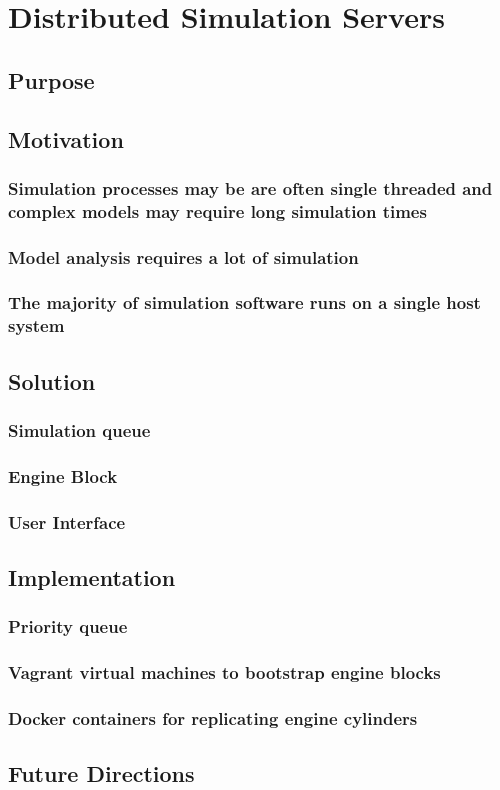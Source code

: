 \chapter{Distributed Simulation Servers}
\label{chap:engine}

\section{Purpose}


\section{Motivation}
\subsection{Simulation processes may be are often single threaded and complex models may require long simulation times}
\subsection{Model analysis requires a lot of simulation}
\subsection{The majority of simulation software runs on a single host system}


\section{Solution}
\subsection{Simulation queue}
\subsection{Engine Block}
\subsection{User Interface}


\section{Implementation}
\subsection{Priority queue}
\subsection{Vagrant virtual machines to bootstrap engine blocks}
\subsection{Docker containers for replicating engine cylinders}


\section{Future Directions}
